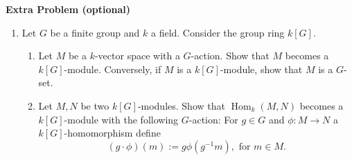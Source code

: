 \documentclass[12pt,
psamsfonts]{amsart}
\theoremstyle{remark}
\theoremstyle{definition}
\DeclareMathOperator{\Hom}{Hom}
\numberwithin{equation}{section}
\begin{document}
\begin{center}
\textbf{Extra Problem (optional)}
\begin{enumerate}
\item Let $G$ be a finite group and $k$ a field. Consider the group ring $k[G]$. 
\begin{enumerate}
\item Let $M$ be a $k$-vector space with a $G$-action. Show that $M$ becomes a $k[G]$-module. Conversely, if $M$ is a $k[G]$-module, show that $M$ is a $G$-set. 
\item Let $M,N$ be two $k[G]$-modules. Show that $\Hom_{k}(M,N)$ becomes a $k[G]$-module with the following $G$-action: For $g\in G$ and $\phi:M\to N$ a $k[G]$-homomorphism define
\[(g\cdot\phi)(m):=g\phi(g^{-1}m),\text{ for }m\in M.\]
\end{enumerate}
\end{enumerate}
\end{center}
\end{document}
